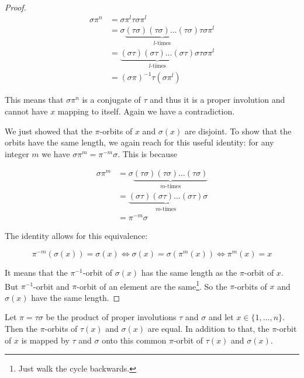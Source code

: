 \begin{proof}
\begin{align*}
\sigma \pi^n &= \sigma \pi^l \tau \sigma \pi^l \\
           &= \sigma \underbrace{(\tau\sigma) (\tau\sigma) \ldots (\tau\sigma)}_{l\text{-times}}  \tau \sigma \pi^l \\
           &= \underbrace{(\sigma \tau) (\sigma \tau) \ldots (\sigma \tau)}_{l\text{-times}} \sigma \tau \sigma \pi^l \\
           &= (\sigma \pi)^{-1} \tau (\sigma \pi^l)
\end{align*}

This means that $\sigma \pi^n$ is a conjugate of $\tau$ and thus it is a proper involution and cannot have $x$ mapping to itself. Again we have a contradiction.

We just showed that the $\pi$-orbits of $x$ and $\sigma(x)$ are disjoint. To show that the orbits have the same length, we again reach for this useful identity: for any integer $m$ we have $\sigma \pi^m = \pi^{-m} \sigma$. This is because

\begin{align*}
\sigma \pi^m &= \sigma \underbrace{(\tau\sigma) (\tau\sigma) \ldots (\tau\sigma)}_{m\text{-times}} \\
           &= \underbrace{(\sigma \tau) (\sigma \tau) \ldots (\sigma \tau)}_{m\text{-times}} \sigma \\
           &= \pi^{-m} \sigma
\end{align*}

The identity allows for this equivalence: 

$$
\pi^{-m}(\sigma(x)) = \sigma(x) \Leftrightarrow \sigma(x) = \sigma(\pi^m(x)) \Leftrightarrow \pi^m(x) = x
$$

It means that the $\pi^{-1}$-orbit of $\sigma(x)$ has the same length as the $\pi$-orbit of $x$. But $\pi^{-1}$-orbit and $\pi$-orbit of an element are the same\footnote{Just walk the cycle backwards.}.
So the $\pi$-orbits of $x$ and $\sigma(x)$ have the same length.
\end{proof}

\begin{thm}\label{involutionproduct2}
Let $\pi = \tau \sigma$ be the product of proper involutions $\tau$ and $\sigma$ and let $x \in \{1, \ldots, n\}$. Then the $\pi$-orbits of $\tau(x)$ and $\sigma(x)$ are equal. In addition to that, the $\pi$-orbit of $x$ is mapped by $\tau$ and $\sigma$ onto this common $\pi$-orbit of $\tau(x)$ and $\sigma(x)$.
\end{thm}

